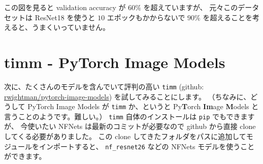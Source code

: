 \documentclass[dvipdfmx,autodetect-engine,10pt,b5paper,papersize,openany,dvipsnames]{jsbook}
\begin{document}
\begin{multicols}{2}
\vspace{5cm}

この図を見ると validation accuracy が $60 \%$ を超えていますが、
元々このデータセットは ResNet18 を使うと $10$ エポックもかからないで
$90 \%$ を超えることを考えると、うまくいっていません。


\section{timm - PyTorch Image Models}
次に、たくさんのモデルを含んでいて評判の高い
\texttt{timm} (github: \href{https://github.com/rwightman/pytorch-image-models}{rwightman/pytorch-image-models}) を試してみることにします。
（ちなみに、どうして PyTorch Image Models が \texttt{timm} か、というと
  Py{\bfseries T}orch {\bfseries Im}age {\bfseries M}odels と言うことのようです。難しい。）
\texttt{timm} 自体のインストールは \texttt{pip} でもできますが、
今使いたい NFNets は最新のコミットが必要なので
github から直接 clone してくる必要がありました。
この clone してきたフォルダをパスに追加してモジュールをインポートすると、
\texttt{nf\_resnet26} などの NFNets モデルを使うことができます。




\end{multicols}
\end{document}
